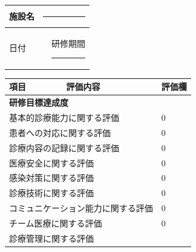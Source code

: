 \documentclass[UTF8,10pt,a4paper,fontset=fandol]{ctexart}
\newcommand{\fieldvalue}[1]{#1}
\newcommand{\handwritten}[1]{#1}
\begin{document}
\noindent
\begin{tabularx}{\textwidth}{|p{}|X|p{}|}
\hline
施設名 & \multicolumn{2}{l|}{\rule{0.65\textwidth}{0.4pt}}\\
\hline
日付 & \rule{0.25\textwidth}{0.4pt} & 研修期間 \rule{0.20\textwidth}{0.4pt}\\
\hline
\end{tabularx}

\vspace{1em}

\begin{tabularx}{\textwidth}{|p{}|X|p{}|}
\hline
項目 & 評価内容 & 評価欄\\
\hline
\multicolumn{3}{|l|}{\textbf{研修目標達成度}}\\
\hline
\multicolumn{2}{|l|}{基本的診療能力に関する評価} &
\fieldvalue{\handwritten{0}}\\
\hline
\multicolumn{2}{|l|}{患者への対応に関する評価} &
\fieldvalue{\handwritten{0}}\\
\hline
\multicolumn{2}{|l|}{診療内容の記録に関する評価} &
\fieldvalue{\handwritten{0}}\\
\hline
\multicolumn{2}{|l|}{医療安全に関する評価} &
\fieldvalue{\handwritten{0}}\\
\hline
\multicolumn{2}{|l|}{感染対策に関する評価} &
\fieldvalue{\handwritten{0}}\\
\hline
\multicolumn{2}{|l|}{診療技術に関する評価} &
\fieldvalue{\handwritten{0}}\\
\hline
\multicolumn{2}{|l|}{コミュニケーション能力に関する評価} &
\fieldvalue{\handwritten{0}}\\
\hline
\multicolumn{2}{|l|}{チーム医療に関する評価} &
\fieldvalue{\handwritten{0}}\\
\hline
\multicolumn{2}{|l|}{診療管理に関する評価} &

\end{tabularx}
\end{document}
